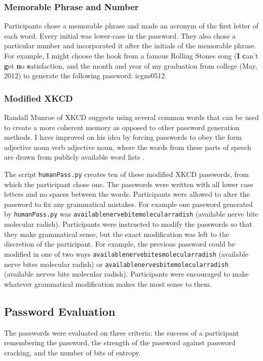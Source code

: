 \documentclass{article}
\begin{document}
\subsubsection*{Memorable Phrase and Number}
Participants chose a memorable phrase and made an acronym of the first letter of each word. Every initial was lower-case in the password. They also chose a particular number and incorporated it after the initials of the memorable phrase. For example, I might choose the hook from a famous Rolling Stones song (\textbf{I} \textbf{c}an't \textbf{g}et \textbf{n}o \textbf{s}atisfaction, and the month and year of my graduation from college (May, 2012) to generate the following password: icgns0512. 

\subsubsection*{Modified XKCD}
Randall Munroe of XKCD suggests using several common words that can be used to create a more coherent memory as opposed to other password generation methods. I have improved on his idea by forcing passwords to obey the form adjective noun verb adjective noun, where the words from these parts of speech are drawn from publicly available word lists \cite{nouns, adjectives, verbs}.

The script \texttt{humanPass.py} creates ten of these modified XKCD passwords, from which the participant chose one. The passwords were written with all lower case letters and no spaces between the words. Participants were allowed to alter the password to fix any grammatical mistakes. For example one password generated by \texttt{humanPass.py} was \texttt{availablenervebitemolecularradish} (available nerve bite molecular radish). Participants were instructed to modify the passwords so that they make grammatical sense, but the exact modification was left to the discretion of the participant. For example, the previous password could be modified in one of two ways \texttt{availablenervebitesmolecularradish} (available nerve bites molecular radish) or \texttt{availablenervesbitemolecularradish} (available nerves bite molecular radish). Participants were encouraged to make whatever grammatical modification makes the most sense to them.

\subsection*{Password Evaluation}
The passwords were evaluated on three criteria: the success of a participant remembering the password, the strength of the password against password cracking, and the number of bits of entropy.
\end{document}
